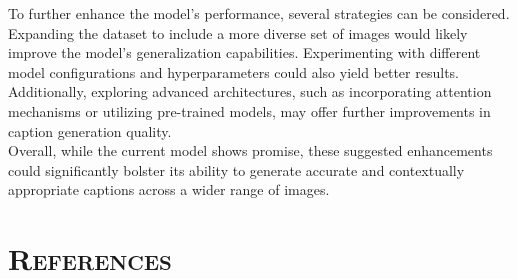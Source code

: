 \documentclass[a4paper,10pt]{article}
\begin{document}
\noindent To further enhance the model's performance, several strategies can be considered. Expanding the dataset to include a more diverse set of images would likely improve the model's generalization capabilities. Experimenting with different model configurations and hyperparameters could also yield better results. Additionally, exploring advanced architectures, such as incorporating attention mechanisms or utilizing pre-trained models, may offer further improvements in caption generation quality.\\

\noindent Overall, while the current model shows promise, these suggested enhancements could significantly bolster its ability to generate accurate and contextually appropriate captions across a wider range of images.\\

\newpage

\section{\scshape{References}}

\nocite{DBLP:journals/corr/abs-2201-12944}
\nocite{DBLP:journals/corr/abs-2012-12877}
\nocite{young-etal-2014-image}
\printbibliography[heading=none]
\end{document}
